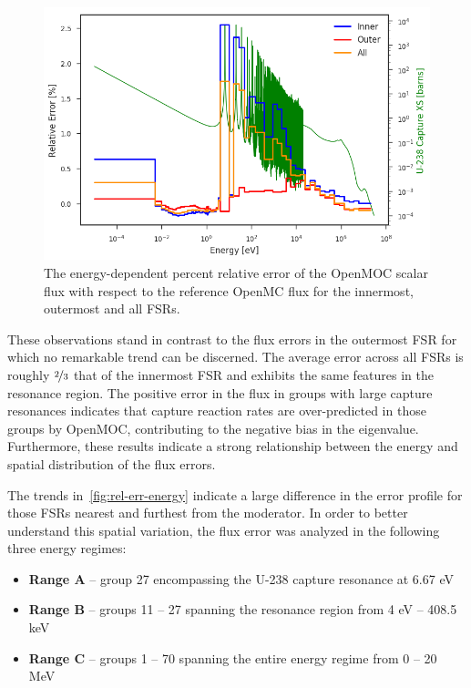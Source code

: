 \begin{figure}[h!]
\centering
\includegraphics[width=\linewidth]{figures/rel-err-inner-outer}
\caption{The energy-dependent percent relative error of the OpenMOC scalar flux with respect to the reference OpenMC flux for the innermost, outermost and all FSRs.}
\label{fig:rel-err-energy}
\end{figure}

These observations stand in contrast to the flux errors in the outermost FSR for which no remarkable trend can be discerned. The average error across all FSRs is roughly $\nicefrac{2}{3}$ that of the innermost FSR and exhibits the same features in the resonance region. The positive error in the flux in groups with large capture resonances indicates that capture reaction rates are over-predicted in those groups by OpenMOC, contributing to the negative bias in the eigenvalue. Furthermore, these results indicate a strong relationship between the energy and spatial distribution of the flux errors.

The trends in~\autoref{fig:rel-err-energy} indicate a large difference in the error profile for those FSRs nearest and furthest from the moderator. In order to better understand this spatial variation, the flux error was analyzed in the following three energy regimes:

\begin{itemize}
  \item {\bf Range A} -- group 27 encompassing the U-238 capture resonance at 6.67 eV
  \item {\bf Range B} -- groups 11 -- 27 spanning the resonance region from 4 eV -- 408.5 keV
  \item {\bf Range C} -- groups 1 -- 70 spanning the entire energy regime from 0 -- 20 MeV
\end{itemize}


